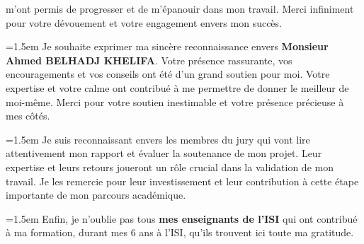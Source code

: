 \begin{center}
m'ont permis de progresser et de m'épanouir dans mon travail. Merci infiniment pour votre dévouement et votre engagement envers mon succès.
\vspace{0.5cm} 
\par \parindent=1.5em Je souhaite exprimer ma sincère reconnaissance envers \textbf{Monsieur Ahmed BELHADJ KHELIFA}. Votre présence rassurante,
 vos encouragements et vos conseils ont été d'un grand soutien pour moi. Votre expertise et votre calme ont contribué à me permettre de donner le meilleur de moi-même. Merci pour votre soutien inestimable et votre présence précieuse à mes côtés.
\vspace{0.5cm} 
\par \parindent=1.5em Je suis reconnaissant envers les membres du jury qui vont lire attentivement mon rapport et évaluer la soutenance de mon projet. 
Leur expertise et leurs retours joueront un rôle crucial dans la validation de mon travail. Je les remercie pour leur investissement et leur contribution à cette étape importante de mon parcours académique.



\vspace{0.5cm} 

\par \parindent=1.5em Enfin, je n’oublie pas tous \textbf{mes enseignants de l’ISI} qui ont contribué à ma formation, durant mes 6 ans à l'ISI, qu’ils trouvent ici toute ma gratitude.
\end{center}
\begin{flushright}
    \LARGE \@author
\end{flushright}